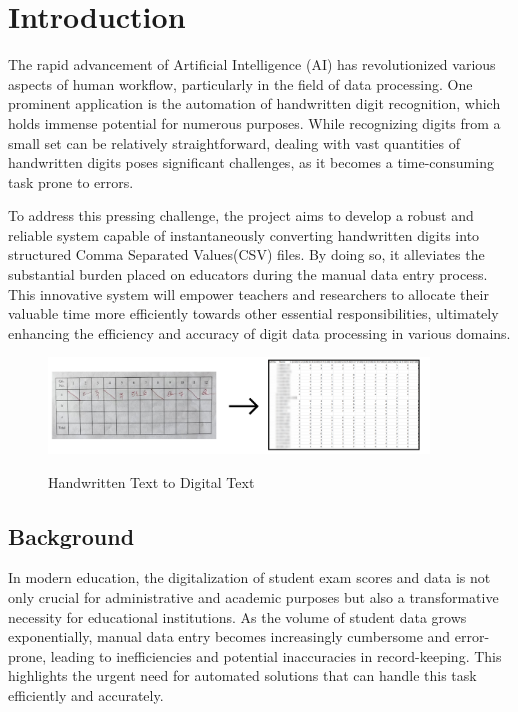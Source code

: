 \setcounter{equation}{0}

\chapter{Introduction}

\noindent The rapid advancement of Artificial Intelligence (AI) has revolutionized various aspects of human workflow, particularly in the field of data processing. One prominent application is the automation of handwritten digit recognition, which holds immense potential for numerous purposes. While recognizing digits from a small set can be relatively straightforward, dealing with vast quantities of handwritten digits poses significant challenges, as
it becomes a time-consuming task prone to errors.

\noindent To address this pressing challenge, the project aims to develop a robust and reliable system capable of instantaneously converting handwritten digits into structured Comma Separated Values(CSV) files. By doing so, it alleviates the substantial burden placed on educators during the manual data entry process. This innovative system will empower teachers and researchers to allocate their valuable time more efficiently towards other essential responsibilities, ultimately enhancing the efficiency and accuracy of digit data processing in various domains.

\begin{figure}[h!]
    \centering
{\includegraphics[width=0.9\textwidth]{Images/Intro/intro_pic.jpg}}
  \caption{Handwritten Text to Digital Text}
\end{figure}

\clearpage

\section{Background}

\noindent In modern education, the digitalization of student exam scores and data is not only crucial for administrative and academic purposes but also a transformative necessity for educational institutions. As the volume of student data grows exponentially, manual data entry becomes increasingly cumbersome and error-prone, leading to inefficiencies and potential inaccuracies in record-keeping. This highlights the urgent need for automated solutions that can handle this task efficiently and accurately.

